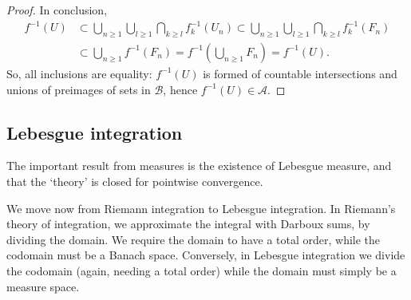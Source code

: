 \documentclass{article}
\begin{document}
\begin{proof}
    In conclusion,
    \begin{align*}
        f^{-1}(U) &\subset \bigcup_{n \geq 1} \bigcup_{l \geq 1} \bigcap_{k \geq l} f_k^{-1}(U_n) \subset \bigcup_{n \geq 1} \bigcup_{l \geq 1} \bigcap_{k \geq l} f_k^{-1}(F_n) \\
                  & \subset \bigcup_{n \geq 1} f^{-1}(F_n) = f^{-1}\left(\bigcup_{n \geq 1} F_n\right) = f^{-1}(U).
    \end{align*}
    So, all inclusions are equality: $f^{-1}(U)$ is formed of countable intersections and unions of preimages of sets in $\mathscr{B}$, hence $f^{-1}(U) \in \mathscr{A}$.
\end{proof}

\subsection{Lebesgue integration}
The important result from measures is the existence of Lebesgue measure, and that the `theory' is closed for pointwise convergence.

We move now from Riemann integration to Lebesgue integration.
In Riemann's theory of integration, we approximate the integral with Darboux sums, by dividing the domain. We require the domain to have a total order, while the codomain must be a Banach space.
Conversely, in Lebesgue integration we divide the codomain (again, needing a total order) while the domain must simply be a measure space.
\end{document}
